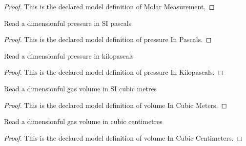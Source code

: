 \begin{proof}
  This is the declared model definition of Molar Measurement.
\end{proof}
\begin{definition}
  \label{def:physics:phyx-mini-0481:phyxminiproblems-problemphyxmini0481-pressureinpascals}
  Read a dimensionful pressure in SI pascals
\end{definition}
\begin{proof}
  This is the declared model definition of pressure In Pascals.
\end{proof}
\begin{definition}
  \label{def:physics:phyx-mini-0481:phyxminiproblems-problemphyxmini0481-pressureinkilopascals}
  Read a dimensionful pressure in kilopascals
\end{definition}
\begin{proof}
  This is the declared model definition of pressure In Kilopascals.
\end{proof}
\begin{definition}
  \label{def:physics:phyx-mini-0481:phyxminiproblems-problemphyxmini0481-volumeincubicmeters}
  Read a dimensionful gas volume in SI cubic metres
\end{definition}
\begin{proof}
  This is the declared model definition of volume In Cubic Meters.
\end{proof}
\begin{definition}
  \label{def:physics:phyx-mini-0481:phyxminiproblems-problemphyxmini0481-volumeincubiccentimeters}
  Read a dimensionful gas volume in cubic centimetres
\end{definition}
\begin{proof}
  This is the declared model definition of volume In Cubic Centimeters.
\end{proof}
